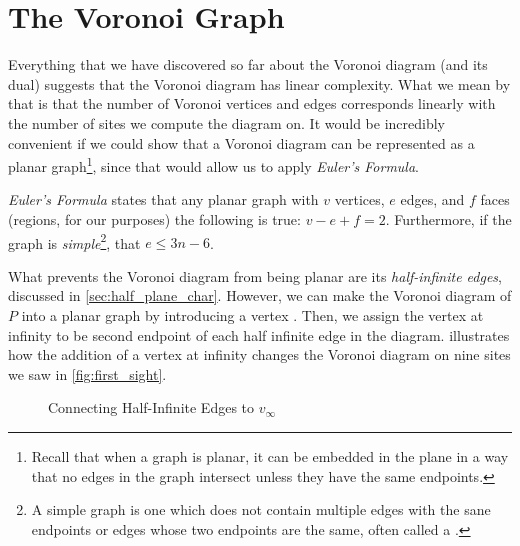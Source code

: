 \documentclass[12pt,twoside]{reedthesis}
\begin{document}
  \section{The Voronoi Graph} %
  \label{sec:voronoi_graph}
    Everything that we have discovered so far about the Voronoi diagram (and its dual) suggests that the Voronoi diagram has linear complexity. What we mean by that is that the number of Voronoi vertices and edges corresponds linearly with the number of sites we compute the diagram on. It would be incredibly convenient if we could show that a Voronoi diagram can be represented as a planar graph\footnote{Recall that when a graph is planar, it can be embedded in the plane in a way that no edges in the graph intersect unless they have the same endpoints.}, since that would allow us to apply \emph{Euler's Formula}.\par

    \emph{Euler's Formula} states that any planar graph with $v$ vertices, $e$ edges, and $f$ faces (regions, for our purposes) the following is true: $v - e + f = 2.$ Furthermore, if the graph is \emph{simple}\footnote{A simple graph is one which does not contain multiple edges with the sane endpoints or edges whose two endpoints are the same, often called a .}, that $e \leq 3n -6$.\par

    What prevents the Voronoi diagram from being planar are its \emph{half-infinite edges}, discussed in \cref{sec:half_plane_char}. However, we can make the Voronoi diagram of $P$ into a planar graph by introducing a vertex . Then, we assign the vertex at infinity to be second endpoint of each half infinite edge in the diagram.  illustrates how the addition of a vertex at infinity changes the Voronoi diagram on nine sites we saw in \cref{fig:first_sight}.\par


    \begin{figure}[!htb]
      \centering
      
      \caption{Connecting Half-Infinite Edges to $v_{\infty}$}
      \label{fig:vertex_at_infinity}
    \end{figure}

\end{document}
